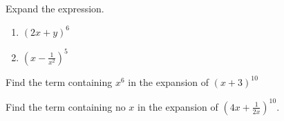 \begin{exercise}
Expand the expression.
\begin{enumerate}[itemsep=0.5\baselineskip, after=\vspace*{0.5\baselineskip}]
    \item $\left(2x+y\right)^6$
    \item $\left(x-\frac{1}{x^2}\right)^5$
\end{enumerate}
\end{exercise}

\begin{exercise}
    Find the term containing $x^6$ in the expansion of $(x+3)^{10}$
\end{exercise}
\begin{exercise}
    Find the term containing no $x$ in the expansion of $\left(4x+\frac{1}{2x}\right)^{10}$.
\end{exercise}